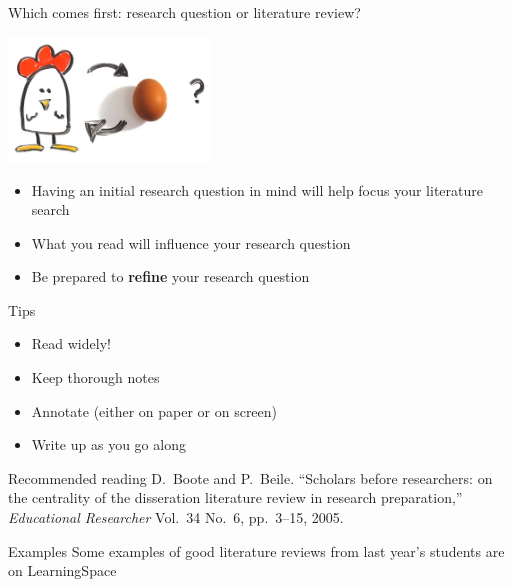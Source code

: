 \begin{frame}{Which comes first: research question or literature review?}
	\pause\begin{center}
		\includegraphics[width=0.4\textwidth]{chickenegg1}
	\end{center}
	\begin{itemize}
		\pause\item Having an initial research question in mind will help focus your literature search
		\pause\item What you read will influence your research question
		\pause\item Be prepared to \textbf{refine} your research question
	\end{itemize}
\end{frame}

\begin{frame}{Tips}
	\begin{itemize}
		\pause\item Read widely!
		\pause\item Keep thorough notes
		\pause\item Annotate (either on paper or on screen)
		\pause\item Write up as you go along
	\end{itemize}
\end{frame}

\begin{frame}{Recommended reading}
	D.\ Boote and P.\ Beile. ``Scholars before researchers: on the centrality of the disseration
		literature review in research preparation,'' \textit{Educational Researcher} Vol.\ 34 No.\ 6, pp.\ 3--15,
		2005.
\end{frame}

\begin{frame}{Examples}
	Some examples of good literature reviews from last year's students are on LearningSpace
\end{frame}
